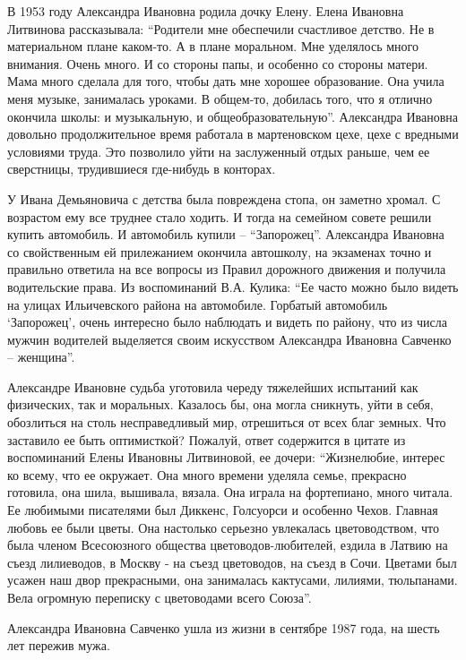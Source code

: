 
В 1953 году Александра Ивановна родила дочку Елену. Елена Ивановна Литвинова
рассказывала: \enquote{Родители мне обеспечили счастливое детство. Не в материальном
плане каком-то. А в плане моральном. Мне уделялось много внимания. Очень много.
И со стороны папы, и особенно со стороны матери. Мама много сделала для того,
чтобы дать мне хорошее образование. Она учила меня музыке, занималась уроками.
В общем-то, добилась того, что я отлично окончила школы: и музыкальную, и
общеобразовательную}. Александра Ивановна довольно продолжительное  время
работала в мартеновском цехе, цехе с вредными условиями  труда. Это позволило
уйти на заслуженный отдых раньше, чем ее сверстницы, трудившиеся где-нибудь в
конторах. 

У Ивана Демьяновича с детства была повреждена стопа, он заметно хромал. С
возрастом ему все труднее стало ходить. И тогда на семейном совете решили
купить автомобиль. И автомобиль купили – \enquote{Запорожец}. Александра Ивановна со
свойственным ей прилежанием окончила автошколу, на экзаменах точно и правильно
ответила на все вопросы из Правил дорожного движения и получила водительские
права. Из воспоминаний В.А. Кулика: \enquote{Ее часто можно было видеть на улицах
Ильичевского района на автомобиле. Горбатый автомобиль \enquote{Запорожец}, очень
интересно было наблюдать и видеть по району, что из числа мужчин водителей
выделяется своим искусством Александра Ивановна Савченко – женщина}.

Александре Ивановне судьба уготовила череду тяжелейших испытаний как
физических, так и моральных. Казалось бы, она могла сникнуть, уйти в себя,
обозлиться на столь несправедливый мир, отрешиться от всех благ земных. Что
заставило ее быть оптимисткой? Пожалуй, ответ содержится в цитате из
воспоминаний Елены Ивановны Литвиновой, ее дочери:  \enquote{Жизнелюбие, интерес ко
всему, что ее окружает. Она много времени уделяла семье, прекрасно готовила,
она шила, вышивала, вязала. Она играла на фортепиано, много читала. Ее любимыми
писателями был Диккенс, Голсуорси и особенно Чехов. Главная любовь ее были
цветы. Она настолько серьезно увлекалась цветоводством, что была членом
Всесоюзного общества цветоводов-любителей, ездила в Латвию на съезд лилиеводов,
в Москву - на съезд цветоводов, на съезд в Сочи. Цветами был усажен наш двор
прекрасными, она занималась кактусами, лилиями, тюльпанами. Вела огромную
переписку с цветоводами всего Союза}.

Александра Ивановна Савченко ушла из жизни в сентябре 1987 года, на шесть лет
пережив мужа.
